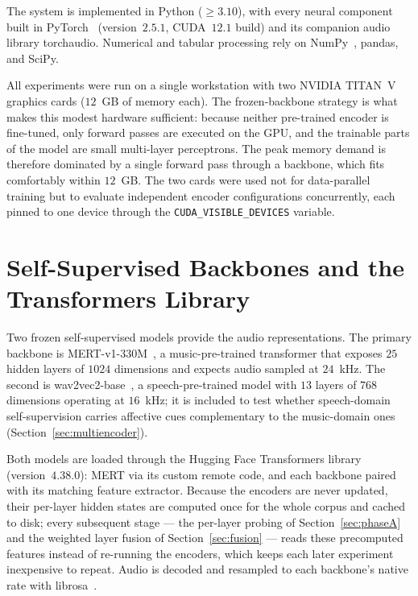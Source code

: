 \documentclass[12pt]{report}
\begin{document}
The system is implemented in Python ($\geq 3.10$), with every neural component built in PyTorch~\cite{paszke_pytorch_2019} (version~$2.5.1$, CUDA~$12.1$ build) and its companion audio library torchaudio. Numerical and tabular processing rely on NumPy~\cite{harris_numpy_2020}, pandas, and SciPy.

All experiments were run on a single workstation with two NVIDIA TITAN~V graphics cards ($12$~GB of memory each). The frozen-backbone strategy is what makes this modest hardware sufficient: because neither pre-trained encoder is fine-tuned, only forward passes are executed on the GPU, and the trainable parts of the model are small multi-layer perceptrons. The peak memory demand is therefore dominated by a single forward pass through a backbone, which fits comfortably within $12$~GB. The two cards were used not for data-parallel training but to evaluate independent encoder configurations concurrently, each pinned to one device through the \texttt{CUDA\_VISIBLE\_DEVICES} variable.

\section{Self-Supervised Backbones and the Transformers Library}

Two frozen self-supervised models provide the audio representations. The primary backbone is \mbox{MERT-v1-330M}~\cite{li_mert_2024}, a music-pre-trained transformer that exposes $25$ hidden layers of $1024$ dimensions and expects audio sampled at $24$~kHz. The second is \mbox{wav2vec2-base}~\cite{baevski_wav2vec2_2020}, a speech-pre-trained model with $13$ layers of $768$ dimensions operating at $16$~kHz; it is included to test whether speech-domain self-supervision carries affective cues complementary to the music-domain ones (Section~\ref{sec:multiencoder}).

Both models are loaded through the Hugging Face Transformers library~\cite{wolf_transformers_2020} (version~$4.38.0$): MERT via its custom remote code, and each backbone paired with its matching feature extractor. Because the encoders are never updated, their per-layer hidden states are computed once for the whole corpus and cached to disk; every subsequent stage --- the per-layer probing of Section~\ref{sec:phaseA} and the weighted layer fusion of Section~\ref{sec:fusion} --- reads these precomputed features instead of re-running the encoders, which keeps each later experiment inexpensive to repeat. Audio is decoded and resampled to each backbone's native rate with librosa~\cite{mcfee_librosa_2015}.
\end{document}
